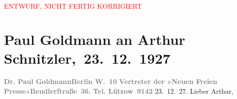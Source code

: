 
\begin{center}
            \textcolor{red}{ENTWURF, NICHT FERTIG KORRIGIERT}
                      \end{center}
            
         
         \renewcommand{\erwaehntePersonen}{Personen: Paul Goldmann, Franziska Goldmann, Eva Marie Goldmann}
         \renewcommand{\erwaehnteInstitutionen}{Institutionen: Neue Freie Presse, Phaidon-Verlag, Österreichische Journal A.G.}
         \renewcommand{\erwaehnteOrte}{Orte: Akademietheater, Bendlerstraße, Berlin, Wien}
         \renewcommand{\erwaehnteWerke}{Werke: Buch der Sprüche und Bedenken, Es ist mein Wille{\rufezeichen} Eine unwahrscheinliche Begebenheit aus dem 18. Jahrhundert in einem Akt}
               \section[ Paul Goldmann an Arthur Schnitzler, 23. 12. 1927]{ Paul Goldmann an Arthur Schnitzler, 23. 12. 1927}\nopagebreak{}\rehead{ }\begin{ledgroupsized}[t]{13cm}\normalsize\beginnumbering{} \toendnotes[C]{\smallbreak\pagebreak[2]} 
\toendnotes[C]{\smallbreak}\pstart
           \noindent{}{\pb}\textcolor{gray}{\textbf{Dr. Paul Goldmann}}\hfill \textcolor{gray}{\textbf{Berlin W. 10}}\pend
           \pstart
           \textcolor{gray}{\textbf{Vertreter der »Neuen Freien
                           Presse«}}\hfill \textcolor{gray}{\textbf{Bendlerſtraße 36.}}\pend
           \pstart
           \raggedleft{}\textcolor{gray}{\textbf{Tel. Lützow 9142}}\pend
           \pstart
           \raggedleft{}23. 12. 27.\pend
           \pstart\center{}Lieber Arthur,\pend\pstart

\end{ledgroupsized}
